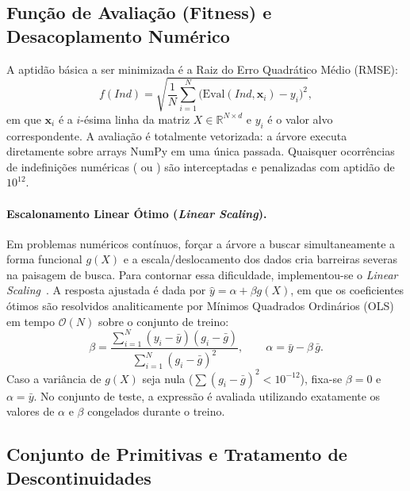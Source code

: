 \subsection{Função de Avaliação (Fitness) e Desacoplamento Numérico}
\label{sec:impl_fitness}

A aptidão básica a ser minimizada é a Raiz do Erro Quadrático Médio (RMSE):
\begin{equation}
  f(\mathit{Ind}) = \sqrt{\frac{1}{N}\sum_{i=1}^{N}\big(\mathrm{Eval}(\mathit{Ind},\mathbf{x}_i)-y_i\big)^2 },
  \label{eq:rmse}
\end{equation}
em que $\mathbf{x}_i$ é a $i$-ésima linha da matriz $X \in \mathbb{R}^{N \times d}$
e $y_i$ é o valor alvo correspondente. A avaliação é totalmente vetorizada: a
árvore executa diretamente sobre arrays NumPy em uma única passada. Quaisquer
ocorrências de indefinições numéricas ( ou ) são
interceptadas e penalizadas com aptidão de $10^{12}$.

\paragraph{Escalonamento Linear Ótimo (\emph{Linear Scaling}).}
Em problemas numéricos contínuos, forçar a árvore a buscar simultaneamente a
forma funcional $g(X)$ e a escala/deslocamento dos dados cria barreiras severas
na paisagem de busca. Para contornar essa dificuldade, implementou-se o
\emph{Linear Scaling}~\cite{keijzer2003improving}. A resposta ajustada é dada
por $\hat{y} = \alpha + \beta g(X)$, em que os coeficientes ótimos são
resolvidos analiticamente por Mínimos Quadrados Ordinários (OLS) em tempo
$\mathcal{O}(N)$ sobre o conjunto de treino:
\begin{equation}
  \beta = \frac{\sum_{i=1}^{N} (y_i - \bar{y})(g_i - \bar{g})}{\sum_{i=1}^{N} (g_i - \bar{g})^2},
  \qquad \alpha = \bar{y} - \beta\,\bar{g}.
  \label{eq:ls}
\end{equation}
Caso a variância de $g(X)$ seja nula ($\sum (g_i-\bar{g})^2 < 10^{-12}$), fixa-se
$\beta = 0$ e $\alpha = \bar{y}$. No conjunto de teste, a expressão é avaliada
utilizando exatamente os valores de $\alpha$ e $\beta$ congelados durante o
treino.

\subsection{Conjunto de Primitivas e Tratamento de Descontinuidades}
\label{sec:impl_primitivas}

